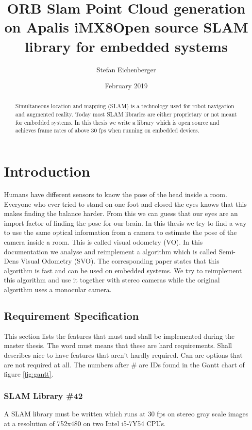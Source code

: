\documentclass[11pt,a4paper,titlepage,oneside]{report}
\title{ORB Slam Point Cloud generation on Apalis iMX8}
\author{Stefan Eichenberger}
\date{February 2019}
\begin{document}
\title{Open source SLAM library for embedded systems}

\maketitle
\begin{abstract}
  Simultaneous location and mapping (SLAM) is a technology used for robot navigation and augmented reality. Today most SLAM libraries are either proprietary or not meant for embedded systems. In this thesis we write a library which is open source and achieves frame rates of above 30 fps when running on embedded devices.
\end{abstract}

\tableofcontents

\chapter{Introduction}

Humans have different sensors to know the pose of the head inside a room. Everyone who ever tried to stand on one foot and closed the eyes knows that this makes finding the balance harder. From this we can guess that our eyes are an import factor of finding the pose for our brain. In this thesis we try to find a way to use the same optical information from a camera to estimate the pose of the camera inside a room. This is called visual odometry (VO). In this documentation we analyse and reimplement a algorithm which is called Semi-Dens Visual Odometry (SVO). The corresponding paper states that this algorithm is fast and can be used on embedded systems. We try to reimplement this algorithm and use it together with stereo cameras while the original algorithm uses a monocular camera.

\section{Requirement Specification}

This section lists the features that must and shall be implemented during the master thesis. The word must means that these are hard requirements. Shall describes nice to have features that aren't hardly required. Can are options that are not required at all. The numbers after \# are IDs found in the Gantt chart of figure \ref{fig:gantt}.

\subsection{SLAM Library \#42}
A SLAM library must be written which runs at 30 fps on stereo gray scale images at a resolution of 752x480 on two Intel i5-7Y54 CPUs.
\end{document}
